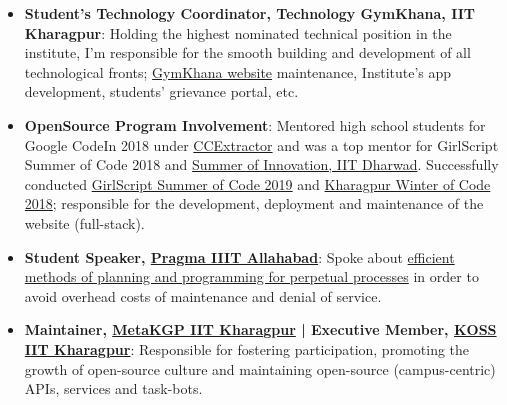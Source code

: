 \documentclass[a4paper,10pt]{extarticle} %
\begin{document}
\begin{itemize}[leftmargin=0.55cm, rightmargin=0.2cm, label={\Large\textbullet}]

\item \textbf{Student's Technology Coordinator, Technology GymKhana, IIT Kharagpur}: Holding the highest nominated technical position in the institute, I'm responsible for the smooth building and development of all technological fronts; \href{http://gymkhana.iitkgp.ac.in/index.php}{GymKhana website} maintenance, Institute's app development, students' grievance portal, etc.

\item \textbf{OpenSource Program Involvement}: Mentored high school students for Google CodeIn 2018 under \href{https://codein.withgoogle.com/organizations/ccextractor-development/}{CCExtractor} and was a top mentor for GirlScript Summer of Code 2018 and \href{https://oss2019.github.io/SoI.html}{Summer of Innovation, IIT Dharwad}. Successfully conducted \href{https://gssoc.tech/}{GirlScript Summer of Code 2019} and \href{https://kwoc.kossiitkgp.org/}{Kharagpur Winter of Code 2018}; responsible for the development, deployment and maintenance of the website (full-stack).

\item \textbf{Student Speaker, \href{http://pragmaconf.tech}{Pragma IIIT Allahabad}}: Spoke about \href{https://prezi.com/view/tf50MBbGtm9FgPKQfieI/}{efficient methods of planning and programming for perpetual processes} in order to avoid overhead costs of maintenance and denial of service. 

\item \textbf{Maintainer, \href{https://wiki.metakgp.org/w/Metakgp:About}{MetaKGP IIT Kharagpur} | Executive Member, \href{https://kossiitkgp.org/about/index.html}{KOSS IIT Kharagpur}}: Responsible for fostering participation, promoting the growth of open-source culture and maintaining open-source (campus-centric) APIs, services and task-bots.
\end{itemize}
\end{document}
